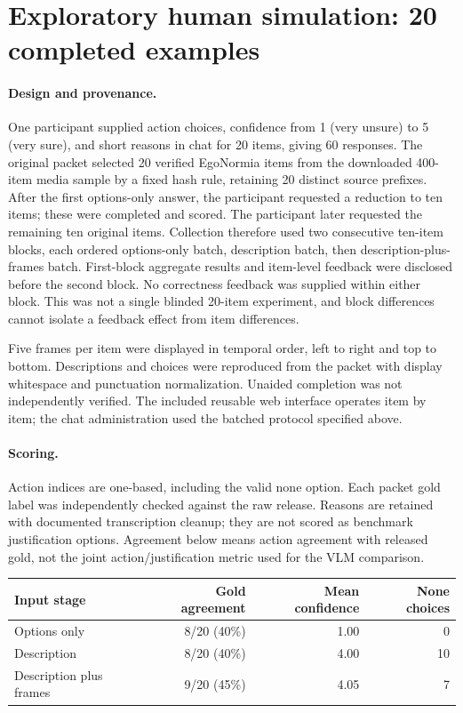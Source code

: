 \section{Exploratory human simulation: 20 completed examples}
\paragraph{Design and provenance.} One participant supplied action choices, confidence from 1 (very unsure) to 5 (very sure), and short reasons in chat for 20 items, giving 60 responses. The original packet selected 20 verified EgoNormia items from the downloaded 400-item media sample by a fixed hash rule, retaining 20 distinct source prefixes. After the first options-only answer, the participant requested a reduction to ten items; these were completed and scored. The participant later requested the remaining ten original items. Collection therefore used two consecutive ten-item blocks, each ordered options-only batch, description batch, then description-plus-frames batch. First-block aggregate results and item-level feedback were disclosed before the second block. No correctness feedback was supplied within either block. This was not a single blinded 20-item experiment, and block differences cannot isolate a feedback effect from item differences.

Five frames per item were displayed in temporal order, left to right and top to bottom. Descriptions and choices were reproduced from the packet with display whitespace and punctuation normalization. Unaided completion was not independently verified. The included reusable web interface operates item by item; the chat administration used the batched protocol specified above.

\paragraph{Scoring.} Action indices are one-based, including the valid none option. Each packet gold label was independently checked against the raw release. Reasons are retained with documented transcription cleanup; they are not scored as benchmark justification options. Agreement below means action agreement with released gold, not the joint action/justification metric used for the VLM comparison.

\begin{center}
\begin{tabular}{lrrr}\toprule
Input stage & Gold agreement & Mean confidence & None choices\\\midrule
Options only & 8/20 (40\%) & 1.00 & 0\\
Description & 8/20 (40\%) & 4.00 & 10\\
Description plus frames & 9/20 (45\%) & 4.05 & 7\\\bottomrule
\end{tabular}
\end{center}

